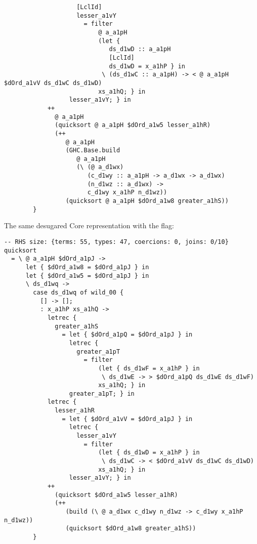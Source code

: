\begin{listing}[H]
\begin{verbatim}
                    [LclId]
                    lesser_a1vY
                      = filter
                          @ a_a1pH
                          (let {
                             ds_d1wD :: a_a1pH
                             [LclId]
                             ds_d1wD = x_a1hP } in
                           \ (ds_d1wC :: a_a1pH) -> < @ a_a1pH $dOrd_a1vV ds_d1wC ds_d1wD)
                          xs_a1hQ; } in
                  lesser_a1vY; } in
            ++
              @ a_a1pH
              (quicksort @ a_a1pH $dOrd_a1w5 lesser_a1hR)
              (++
                 @ a_a1pH
                 (GHC.Base.build
                    @ a_a1pH
                    (\ (@ a_d1wx)
                       (c_d1wy :: a_a1pH -> a_d1wx -> a_d1wx)
                       (n_d1wz :: a_d1wx) ->
                       c_d1wy x_a1hP n_d1wz))
                 (quicksort @ a_a1pH $dOrd_a1w8 greater_a1hS))
        }
\end{verbatim}
\label{code:quicksort_core_raw}
\end{listing}

The same desugared Core representation with the  flag:

\begin{listing}[H]
\begin{verbatim}
-- RHS size: {terms: 55, types: 47, coercions: 0, joins: 0/10}
quicksort
  = \ @ a_a1pH $dOrd_a1pJ ->
      let { $dOrd_a1w8 = $dOrd_a1pJ } in
      let { $dOrd_a1w5 = $dOrd_a1pJ } in
      \ ds_d1wq ->
        case ds_d1wq of wild_00 {
          [] -> [];
          : x_a1hP xs_a1hQ ->
            letrec {
              greater_a1hS
                = let { $dOrd_a1pQ = $dOrd_a1pJ } in
                  letrec {
                    greater_a1pT
                      = filter
                          (let { ds_d1wF = x_a1hP } in
                           \ ds_d1wE -> > $dOrd_a1pQ ds_d1wE ds_d1wF)
                          xs_a1hQ; } in
                  greater_a1pT; } in
            letrec {
              lesser_a1hR
                = let { $dOrd_a1vV = $dOrd_a1pJ } in
                  letrec {
                    lesser_a1vY
                      = filter
                          (let { ds_d1wD = x_a1hP } in
                           \ ds_d1wC -> < $dOrd_a1vV ds_d1wC ds_d1wD)
                          xs_a1hQ; } in
                  lesser_a1vY; } in
            ++
              (quicksort $dOrd_a1w5 lesser_a1hR)
              (++
                 (build (\ @ a_d1wx c_d1wy n_d1wz -> c_d1wy x_a1hP n_d1wz))
                 (quicksort $dOrd_a1w8 greater_a1hS))
        }

\end{verbatim}
\label{code:quicksort_core_dsuppress}
\end{listing}

